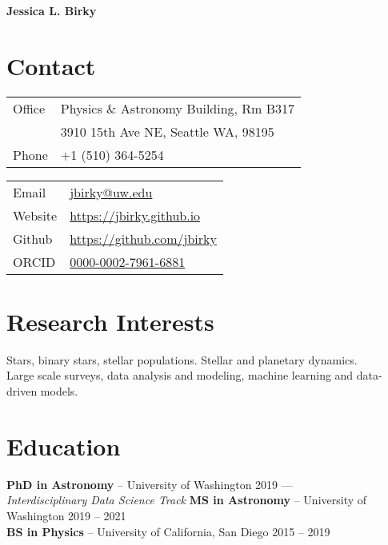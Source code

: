 \documentclass[margin,line]{resume}
\begin{document}
{\sc \textbf{\Large Jessica L. Birky}} 
\vspace{0.3cm}
\begin{resume}

 
\section{\mysidestyle \textcolor{bcolor}{Contact}}

\noindent\begin{multicols}{2}\small
\noindent\begin{tabular}{@{}l|l}
  \multirow{1}{*}{Office}   & Physics \& Astronomy Building, Rm B317  \\
  \multirow{1}{*}{}         & 3910 15th Ave NE, Seattle WA, 98195  \\
  \multirow{1}{*}{Phone}    & +1 (510) 364-5254 \\
\end{tabular}

\noindent\begin{tabular}{@{}l|l}
  \multirow{1}{*}{Email}    &   \href{jbirky@ucsd.edu}{jbirky@uw.edu} \\
  \multirow{1}{*}{Website}  &   \href{https://jbirky.github.io/}{https://jbirky.github.io} \\
  \multirow{1}{*}{Github}   &   \href{https://github.com/jbirky}{https://github.com/jbirky} \\
  \multirow{1}{*}{ORCID}    &   \href{https://orcid.org/0000-0002-7961-6881}{0000-0002-7961-6881} \\
\end{tabular} 
\end{multicols}


\section{\mysidestyle \textcolor{bcolor}{Research Interests}}
Stars, binary stars, stellar populations. Stellar and planetary dynamics. \\
Large scale surveys, data analysis and modeling, machine learning and data-driven models. 
 
       
\section{\mysidestyle \textcolor{bcolor}{Education}}
\textbf{PhD in Astronomy} -- University of Washington  \hfill 2019 --- \\
\textsl{Interdisciplinary Data Science Track} \vspace{.1cm} \newline
\textbf{MS in Astronomy} -- University of Washington  \hfill 2019 -- 2021 \\
\textbf{BS in Physics} -- University of California, San Diego \hfill 2015 -- 2019 


\end{resume}
\end{document}
